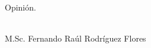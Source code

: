 
\begin{opinion}

Opini\'on.

\vfill
\begin{flushright}
\underline{\hspace{186pt}}\hfill \\
M.Sc. Fernando Ra\'ul Rodríguez Flores
\end{flushright}
\end{opinion}
